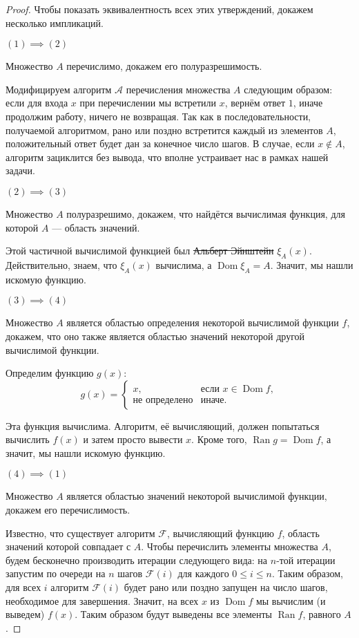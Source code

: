 \documentclass{article}
\begin{document}
    \begin{proof}
        Чтобы показать эквивалентность всех этих утверждений, докажем несколько импликаций.

        $(1) \implies (2)$

        Множество $A$ перечислимо, докажем его полуразрешимость.

        Модифицируем алгоритм $\mathcal{A}$ перечисления множества $A$ следующим образом: если для входа $x$
        при перечислении мы встретили $x$, вернём ответ $1$, иначе продолжим работу, ничего не возвращая.
        Так как в последовательности, получаемой алгоритмом, рано или поздно встретится каждый из
        элементов $A$, положительный ответ будет дан за конечное число шагов. В случае, если $x
        \not\in A$, алгоритм зациклится без вывода, что вполне устраивает нас в рамках нашей задачи.

        $(2) \implies (3)$

        Множество $A$ полуразрешимо, докажем, что найдётся вычислимая функция, для которой $A$ ---
        область значений.

        Этой частичной вычислимой функцией был \sout{Альберт Эйнштейн} $\xi_A(x)$. Действительно,
        знаем, что $\xi_A(x)$ вычислима, а $\operatorname{Dom} \xi_A = A$. Значит, мы
        нашли искомую функцию.

        $(3) \implies (4)$

        Множество $A$ является областью определения некоторой вычислимой функции $f$, докажем, что
        оно также является областью значений некоторой другой вычислимой функции.

        Определим функцию $g(x)$:
        $$
            g(x) =
            \begin{cases}
                x, & \text{если } x \in \operatorname{Dom} f,\\
                \text{не определено} & \text{иначе.}
            \end{cases}
        $$

        Эта функция вычислима. Алгоритм, её вычисляющий, должен попытаться вычислить $f(x)$ и затем
        просто вывести $x$. Кроме того, $\operatorname{Ran} g = \operatorname{Dom} f$, а значит, мы
        нашли искомую функцию.

        $(4) \implies (1)$

        Множество $A$ является областью значений некоторой вычислимой функции, докажем его
        перечислимость.

        Известно, что существует алгоритм $\mathcal{F}$, вычисляющий функцию $f$, область значений
        которой совпадает с $A$. Чтобы перечислить элементы множества $A$, будем бесконечно
        производить итерации следующего вида: на $n$-той итерации запустим по очереди на $n$
        шагов $\mathcal{F}(i)$ для каждого $0 \leqslant i \leqslant n$. Таким образом, для всех $i$
        алгоритм $\mathcal{F}(i)$ будет рано или поздно запущен на число шагов, необходимое для
        завершения.  Значит, на всех $x$ из $\operatorname{Dom} f$ мы вычислим (и выведем) $f(x)$.
        Таким образом будут выведены все элементы $\operatorname{Ran} f$, равного $A$.


\end{proof}
\end{document}
